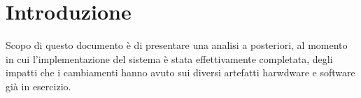 \chapter{Introduzione}
Scopo di questo documento è di presentare una analisi a posteriori, al momento in cui l'implementazione del sistema è stata effettivamente completata, degli impatti che i cambiamenti hanno avuto sui diversi artefatti harwdware e software già in esercizio.